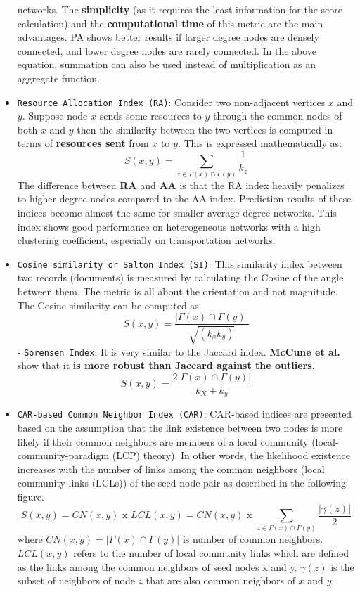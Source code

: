 \begin{itemize}
          networks. The \textbf{simplicity} (as it requires the least information
          for the score calculation) and the \textbf{computational time} of this
          metric are the main advantages. PA shows better results if larger degree
          nodes are densely connected, and lower degree nodes are rarely
          connected. In the above equation, summation can also be used instead of
          multiplication as an aggregate function.
    \item \texttt{Resource\ Allocation\ Index\ (RA)}: Consider two non-adjacent
          vertices \(x\) and \(y\). Suppose node \(x\) sends some resources to
          \(y\) through the common nodes of both \(x\) and \(y\) then the
          similarity between the two vertices is computed in terms of
          \textbf{resources sent} from \(x\) to \(y\). This is expressed
          mathematically as:
          \[S(x, y) = \sum_{z \in \Gamma(x) \cap \Gamma(y)} \frac{1}{k_z}\] The
          difference between \textbf{RA} and \textbf{AA} is that the RA index
          heavily penalizes to higher degree nodes compared to the AA index.
          Prediction results of these indices become almost the same for smaller
          average degree networks. This index shows good performance on
          heterogeneous networks with a high clustering coefficient, especially on
          transportation networks.
    \item \texttt{Cosine\ similarity\ or\ Salton\ Index\ (SI)}: This similarity
          index between two records (documents) is measured by calculating the
          Cosine of the angle between them. The metric is all about the
          orientation and not magnitude. The Cosine similarity can be computed as
          \[S(x, y) = \frac{|\Gamma(x) \cap \Gamma(y)|}{\sqrt{(k_x k_y)}}\] -
          \texttt{Sorensen\ Index}: It is very similar to the Jaccard index.
          \textbf{McCune et al.} show that it \textbf{is more robust than Jaccard
              against the outliers}.
          \[S(x, y) = \frac{2|\Gamma(x) \cap \Gamma(y)|}{k_X + k_y}\]
    \item \texttt{CAR-based\ Common\ Neighbor\ Index\ (CAR)}: CAR-based indices
          are presented based on the assumption that the link existence between
          two nodes is more likely if their common neighbors are members of a
          local community (local-community-paradigm (LCP) theory). In other words,
          the likelihood existence increases with the number of links among the
          common neighbors (local community links (LCLs)) of the seed node pair as
          described in the following figure.
          \[S(x, y) = CN(x, y) \text{ x } LCL(x, y) = CN(x, y) \text{ x } \sum_{z \in \Gamma(x) \cap \Gamma(y)} \frac{|\gamma(z)|}{2} \]
          where \(CN(x, y) = |\Gamma(x) ∩ \Gamma(y)|\) is number of common
          neighbors. \(LCL(x, y)\) refers to the number of local community links
          which are defined as the links among the common neighbors of seed nodes
          x and y. \(\gamma(z)\) is the subset of neighbors of node \(z\) that are
          also common neighbors of \(x\) and \(y\).


\end{itemize}
